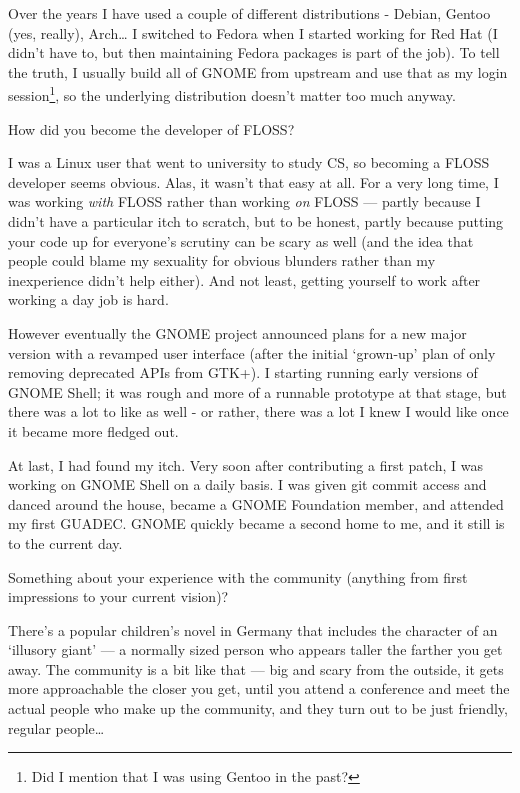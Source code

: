 \documentclass[10pt, a5paper]{article}
\begin{document}
\begin{Parallel}[p]{}{}
{Over the years I have used a couple of different distributions - Debian, Gentoo (yes, really), Arch… I switched to Fedora when I started working for Red Hat (I didn't have to, but then maintaining Fedora packages is part of the job). To tell the truth, I usually build all of GNOME from upstream and use that as my login session\footnote{Did I mention that I was using Gentoo in the past?}, so the underlying distribution doesn't matter too much anyway.




\q How did you become the developer of FLOSS?

\a I was a Linux user that went to university to study CS, so becoming a FLOSS developer seems obvious. Alas, it wasn't that easy at all. For a very long time, I was working \emph{with} FLOSS rather than working \emph{on} FLOSS — partly because I didn't have a particular itch to scratch, but to be honest, partly because putting your code up for everyone's scrutiny can be scary as well (and the idea that people could blame my sexuality for obvious blunders rather than my inexperience didn't help either). And not least, getting yourself to work after working a day job is hard.

However eventually the GNOME project announced plans for a new major version with a revamped user interface (after the initial ‘grown-up’ plan of only removing deprecated APIs from GTK+). I starting running early versions of GNOME  Shell; it was rough and more of a runnable prototype at that stage, but there was a lot to like as well - or rather, there was a lot I knew I would like once it became more fledged out.

At last, I had found my itch. Very soon after contributing a first patch, I was working on GNOME Shell on a daily basis. I was given git commit access and danced around the house, became a GNOME Foundation member, and attended my first GUADEC. GNOME quickly became a second home to me, and it still is to the current day.


\q Something about your experience with the community (anything from first
impressions to your current vision)?

\a There's a popular children's novel in Germany that includes the character of an ‘illusory giant’ — a normally sized person who appears taller the farther you get away. The community is a bit like that — big and scary from the outside, it gets more approachable the closer you get, until you attend a conference and meet the actual people who make up the community, and they turn out to be just friendly, regular people…

}
\end{Parallel}
\end{document}
